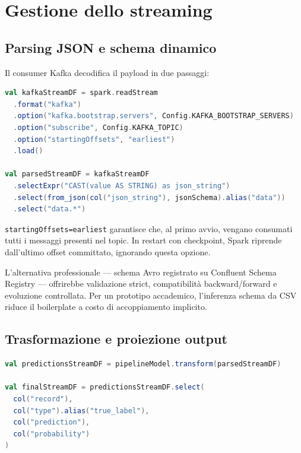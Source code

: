 \section{Gestione dello streaming}\label{sec:gestione-streaming}

\subsection{Parsing JSON e schema dinamico}\label{subsec:parsing-json}

Il consumer Kafka decodifica il payload in due passaggi:

\begin{lstlisting}[language=Scala,caption={Parsing messaggi Kafka in \texttt{EcgStreamingPredictor}.},label={lst:from-json}]
val kafkaStreamDF = spark.readStream
  .format("kafka")
  .option("kafka.bootstrap.servers", Config.KAFKA_BOOTSTRAP_SERVERS)
  .option("subscribe", Config.KAFKA_TOPIC)
  .option("startingOffsets", "earliest")
  .load()

val parsedStreamDF = kafkaStreamDF
  .selectExpr("CAST(value AS STRING) as json_string")
  .select(from_json(col("json_string"), jsonSchema).alias("data"))
  .select("data.*")
\end{lstlisting}

\texttt{startingOffsets=earliest} garantisce che, al primo avvio, vengano consumati tutti i messaggi presenti nel topic.
In restart con checkpoint, Spark riprende dall'ultimo offset committato, ignorando questa opzione.

L'alternativa professionale --- schema Avro registrato su Confluent Schema Registry --- offrirebbe validazione strict, compatibilità backward/forward e evoluzione controllata.
Per un prototipo accademico, l'inferenza schema da CSV riduce il boilerplate a costo di accoppiamento implicito.

\subsection{Trasformazione e proiezione output}

\begin{lstlisting}[language=Scala,caption={Inferenza e selezione colonne output.},label={lst:transform}]
val predictionsStreamDF = pipelineModel.transform(parsedStreamDF)

val finalStreamDF = predictionsStreamDF.select(
  col("record"),
  col("type").alias("true_label"),
  col("prediction"),
  col("probability")
)
\end{lstlisting}

